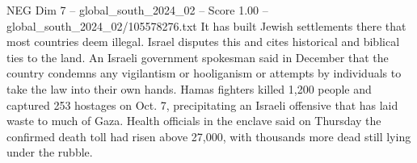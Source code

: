 \begin{textsample}{NEG Dim 7 – global\_south\_2024\_02 – Score 1.00 – global\_south\_2024\_02/105578276.txt}
It has built Jewish settlements there that most countries deem illegal.
Israel disputes this and cites historical and biblical ties to the land.
An Israeli government spokesman said in December that the country condemns any vigilantism or hooliganism or attempts by individuals to take the law into their own hands.
Hamas fighters killed 1,200 people and captured 253 hostages on Oct. 7, precipitating an Israeli offensive that has laid waste to much of Gaza.
Health officials in the enclave said on Thursday the confirmed death toll had risen above 27,000, with thousands more dead still lying under the rubble.

\end{textsample}
